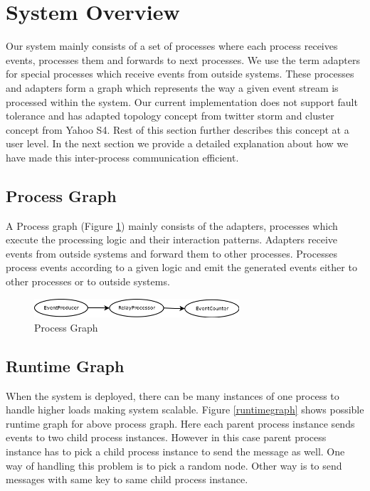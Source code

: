 \section{System Overview}
Our system mainly consists of a set of processes where each process receives events, processes them and forwards to next processes. We use the term adapters for special processes which receive events from outside systems. These processes and adapters form a graph which represents the way a given event stream is processed within the system. Our current implementation does not support fault tolerance and has adapted topology concept from twitter storm\cite{twitterStorm} and cluster concept from Yahoo S4\cite{neumeyer2010s4}. Rest of this section further describes this concept at a user level. In the next section we provide a detailed explanation about how we have made this inter-process communication efficient. 
\subsection{Process Graph}
A Process graph (Figure \ref{processgraph}) mainly consists of the adapters, processes which execute the processing logic and their interaction patterns. Adapters receive events from outside systems and forward them to other processes. Processes process events according to a given logic and emit the generated events either to other processes or to outside systems. 

\begin{figure}[!t]
	\centering
	\includegraphics[width=3.0in]{processgraph.png}
	\caption{Process Graph}
	\label{processgraph}
\end{figure}

\subsection{Runtime Graph}
When the system is deployed, there can be many instances of one process to handle higher loads making system scalable. Figure \ref{runtimegraph} shows possible runtime graph for above process graph. Here each parent process instance sends events to two child process instances. However in this case parent process instance has to pick a child process instance to send the message as well. One way of handling this problem is to pick a random node. Other way is to send messages with same key to same child process instance. 

